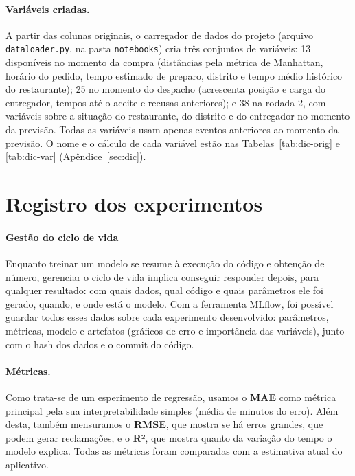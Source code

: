\documentclass[11pt,a4paper]{article}
\begin{document}
\paragraph{Variáveis criadas.} A partir das colunas originais, o carregador de dados
do projeto (arquivo \texttt{dataloader.py}, na pasta \texttt{notebooks}) cria três conjuntos de variáveis: 13 disponíveis no momento
da compra (distâncias pela métrica de Manhattan, horário do pedido, tempo estimado de preparo,
distrito e tempo médio histórico do restaurante); 25 no momento do despacho (acrescenta posição
e carga do entregador, tempos até o aceite e recusas anteriores); e 38 na rodada 2, com
variáveis sobre a situação do restaurante, do distrito e do entregador no momento da previsão.
Todas as variáveis usam apenas eventos anteriores ao momento da previsão. O nome e o cálculo de cada
variável estão nas Tabelas~\ref{tab:dic-orig} e \ref{tab:dic-var} (Apêndice~\ref{sec:dic}).

\section{Registro dos experimentos}
\label{sec:exp}

\paragraph{Gestão do ciclo de vida} Enquanto treinar um modelo se resume à execução do
código e obtenção de número, gerenciar o ciclo de vida implica conseguir responder depois, para
qualquer resultado: com quais dados, qual código e quais parâmetros ele foi gerado, quando, e
onde está o modelo. Com a ferramenta MLflow, foi possível guardar todos esses dados sobre cada
experimento desenvolvido: parâmetros, métricas, modelo e artefatos (gráficos de erro e importância das variáveis), junto com o hash dos
dados e o commit do código.

\paragraph{Métricas.} Como trata-se de um esperimento de regressão, usamos o \textbf{MAE} como métrica principal
pela sua interpretabilidade simples (média de minutos do erro). Além desta, também
mensuramos o \textbf{RMSE}, que mostra se há erros grandes,
que podem gerar reclamações, e o \textbf{R²}, que mostra quanto da variação do tempo o modelo
explica. Todas as métricas foram comparadas com a estimativa atual do aplicativo.
\end{document}
